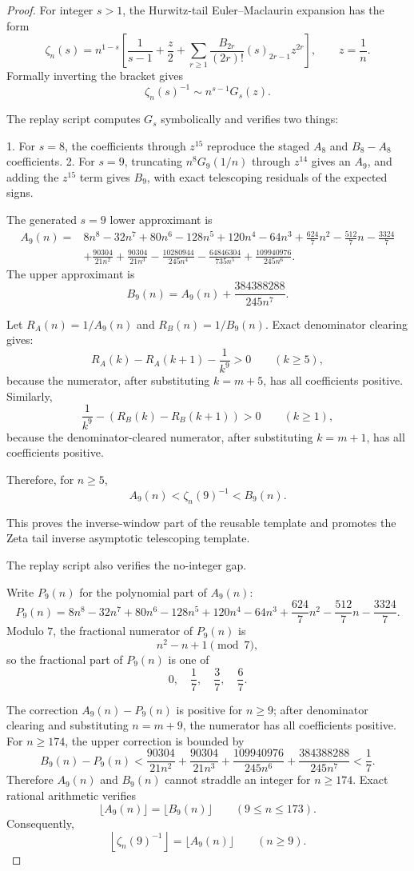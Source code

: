 \documentclass[11pt]{article}
\numberwithin{equation}{section}
\theoremstyle{definition}
\theoremstyle{remark}
\newcommand{\1}{\mathbf 1}
\begin{document}
\begin{proof}
For integer \(s>1\), the Hurwitz-tail Euler--Maclaurin expansion has the form
\[
\zeta_n(s)
=n^{1-s}\left[
\frac1{s-1}+\frac{z}{2}
+\sum_{r\ge1}\frac{B_{2r}}{(2r)!}(s)_{2r-1}z^{2r}
\right],
\qquad z=\frac1n.
\]
Formally inverting the bracket gives
\[
\zeta_n(s)^{-1}\sim n^{s-1}G_s(z).
\]

The replay script
computes \(G_s\) symbolically and verifies two things:

1. For \(s=8\), the coefficients through \(z^{15}\) reproduce the staged \(A_8\) and \(B_8-A_8\) coefficients.
2. For \(s=9\), truncating \(n^8G_9(1/n)\) through \(z^{14}\) gives an \(A_9\), and adding the \(z^{15}\) term gives \(B_9\), with exact telescoping residuals of the expected signs.

The generated \(s=9\) lower approximant is
\[
\begin{aligned}
A_9(n)=&8n^8-32n^7+80n^6-128n^5+120n^4-64n^3
+\frac{624}{7}n^2-\frac{512}{7}n-\frac{3324}{7}\\
&+\frac{90304}{21n^2}+\frac{90304}{21n^3}
-\frac{10280944}{245n^4}-\frac{64846304}{735n^5}
+\frac{109940976}{245n^6}.
\end{aligned}
\]
The upper approximant is
\[
B_9(n)=A_9(n)+\frac{384388288}{245n^7}.
\]

Let \(R_A(n)=1/A_9(n)\) and \(R_B(n)=1/B_9(n)\). Exact denominator clearing gives:
\[
R_A(k)-R_A(k+1)-\frac1{k^9}>0
\qquad(k\ge5),
\]
because the numerator, after substituting \(k=m+5\), has all coefficients positive. Similarly,
\[
\frac1{k^9}-\left(R_B(k)-R_B(k+1)\right)>0
\qquad(k\ge1),
\]
because the denominator-cleared numerator, after substituting \(k=m+1\), has all coefficients positive.

Therefore, for \(n\ge5\),
\[
A_9(n)<\zeta_n(9)^{-1}<B_9(n).
\]

This proves the inverse-window part of the reusable template and promotes the Zeta tail inverse asymptotic telescoping template.

The replay script also verifies the no-integer gap.

Write \(P_9(n)\) for the polynomial part of \(A_9(n)\):
\[
P_9(n)=8n^8-32n^7+80n^6-128n^5+120n^4-64n^3
+\frac{624}{7}n^2-\frac{512}{7}n-\frac{3324}{7}.
\]
Modulo \(7\), the fractional numerator of \(P_9(n)\) is
\[
n^2-n+1\pmod 7,
\]
so the fractional part of \(P_9(n)\) is one of
\[
0,\quad \frac17,\quad \frac37,\quad \frac67.
\]

The correction \(A_9(n)-P_9(n)\) is positive for \(n\ge9\); after denominator clearing and substituting \(n=m+9\), the numerator has all coefficients positive. For \(n\ge174\), the upper correction is bounded by
\[
B_9(n)-P_9(n)
<
\frac{90304}{21n^2}
+\frac{90304}{21n^3}
+\frac{109940976}{245n^6}
+\frac{384388288}{245n^7}
<\frac17.
\]
Therefore \(A_9(n)\) and \(B_9(n)\) cannot straddle an integer for \(n\ge174\). Exact rational arithmetic verifies
\[
\lfloor A_9(n)\rfloor=\lfloor B_9(n)\rfloor
\qquad(9\le n\le173).
\]
Consequently,
\[
\left\lfloor\zeta_n(9)^{-1}\right\rfloor=\lfloor A_9(n)\rfloor
\qquad(n\ge9).
\]


\end{proof}
\end{document}
